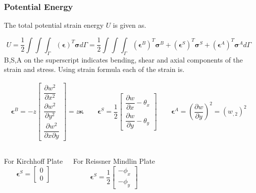 \documentclass[9pt]{beamer}
\newcommand{\vect}[1]{\boldsymbol{#1}}
\begin{document}
\begin{frame}\frametitle{Potential Energy}
The total potential strain energy $U$ is given as.

\begin{equation*}
U=\frac{1}{2} \int\int\int_\Gamma \left(\vect{\epsilon}\right)^T \vect{\sigma} d \Gamma 
=
\frac{1}{2} \int\int\int_\Gamma \left(\vect{\epsilon}^B\right)^T \vect{\sigma}^B + \left(\vect{\epsilon}^S\right)^T \vect{\sigma}^S + \left(\vect{\epsilon}^A\right)^T \vect{\sigma}^A d \Gamma
\end{equation*}
B,S,A on the superscript indicates bending, shear and axial components of the strain and stress. Using strain formula each of the strain is.

\begin{align*}
\vect{\epsilon}^B = -z
\begin{bmatrix}
\dfrac{\partial w^2 }{\partial x^2}
\\
\dfrac{\partial w^2 }{\partial y^2}
\\
\dfrac{\partial w^2 }{\partial x \partial y}
\end{bmatrix}
=
 z \boldsymbol{\kappa}
\qquad
\vect{\epsilon}^S = \dfrac{1}{2}
\begin{bmatrix}
\dfrac{\partial w}{\partial x}-\theta_x 
\\
\dfrac{\partial w}{\partial y}-\theta_y 
\end{bmatrix}
\qquad
\vect{\epsilon}^A = 
 \left( \dfrac{\partial w}{\partial y} \right)^2
 =
 \left( w_{,2} \right)^2
\end{align*}

\begin{columns}
For Kirchhoff Plate
\begin{equation*}
\vect{\epsilon}^S =
\begin{bmatrix}
0
\\
0
\end{bmatrix}
\end{equation*}



For Reissner Mindlin Plate
\begin{equation*}
\vect{\epsilon}^S = \dfrac{1}{2}
\begin{bmatrix}
-\phi_x
\\
-\phi_y
\end{bmatrix}
\end{equation*}
\end{columns}
\end{frame}
\end{document}
